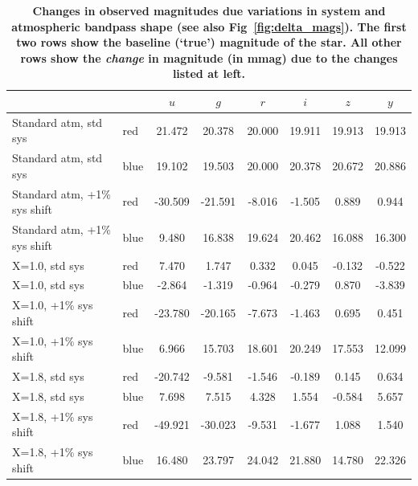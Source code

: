 \documentclass[12pt,preprint]{aastex}
\begin{document}
\begin{center}
\begin{table}[htb]
\caption{{\bf Changes in observed magnitudes due variations in system and atmospheric
 bandpass shape (see also Fig~\ref{fig:delta_mags}). The first two
rows show the baseline (`true') magnitude of the star. All other rows show the 
{\it change} in magnitude (in mmag) due to the changes listed at left. } }
\begin{tabular}{l l | c c c c c c}
& & $u$ & $g$ & $r$ & $i$ & $z$ & $y$ \\ 
\hline \hline
Standard atm, std sys &  red & 21.472 & 20.378 & 20.000 & 19.911 & 19.913 & 19.913 \\
Standard atm, std sys  &  blue & 19.102 & 19.503 & 20.000 & 20.378 & 20.672 & 20.886 \\ \hline \hline
Standard atm, +1\% sys shift & red  & -30.509 & -21.591 & -8.016 & -1.505 & 0.889 & 0.944 \\
Standard atm, +1\% sys shift & blue  & 9.480 & 16.838 & 19.624 & 20.462 & 16.088 & 16.300 \\ \hline
X=1.0, std sys & red  & 7.470 & 1.747 & 0.332 & 0.045 & -0.132 & -0.522 \\
X=1.0, std sys & blue  & -2.864 & -1.319 & -0.964 & -0.279 & 0.870 & -3.839 \\ \hline
X=1.0, +1\% sys shift & red & -23.780 & -20.165 & -7.673 & -1.463 & 0.695 & 0.451 \\
X=1.0, +1\% sys shift & blue & 6.966 & 15.703 & 18.601 & 20.249 & 17.553 & 12.099 \\ \hline
X=1.8, std sys  & red & -20.742 & -9.581 & -1.546 & -0.189 & 0.145 & 0.634 \\
X=1.8, std sys  & blue & 7.698 & 7.515 & 4.328 & 1.554 & -0.584 & 5.657 \\ \hline
X=1.8, +1\% sys shift & red & -49.921 & -30.023 & -9.531 & -1.677 & 1.088 & 1.540 \\
X=1.8, +1\% sys shift & blue & 16.480 & 23.797 & 24.042 & 21.880 & 14.780 & 22.326 \\ \hline
\end{tabular}
\label{tab:delta_mags}
\end{table}
\end{center}
\end{document}
